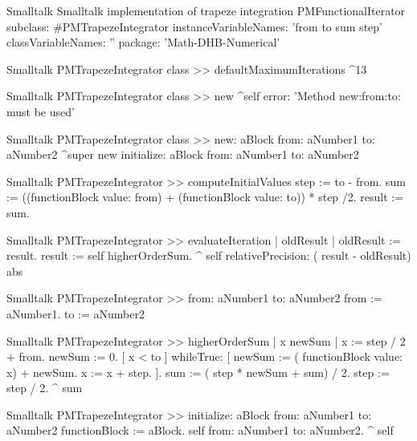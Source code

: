 \begin{listing}[label=lst:trapeze]{Smalltalk}
{Smalltalk implementation of trapeze integration}
PMFunctionalIterator subclass: #PMTrapezeIntegrator
   instanceVariableNames: 'from to sum step'
   classVariableNames: ''
   package: 'Math-DHB-Numerical'
\end{listing}

\begin{displaycode}{Smalltalk}
PMTrapezeIntegrator class >> defaultMaximumIterations
    ^13
\end{displaycode}

\begin{displaycode}{Smalltalk}
PMTrapezeIntegrator class >> new
    ^self error: 'Method new:from:to: must be used'
\end{displaycode}

\begin{displaycode}{Smalltalk}
PMTrapezeIntegrator class >> new: aBlock from: aNumber1 to: aNumber2
    ^super new initialize: aBlock from: aNumber1 to: aNumber2
\end{displaycode}

\begin{displaycode}{Smalltalk}
PMTrapezeIntegrator >> computeInitialValues
    step := to - from.
    sum := ((functionBlock value: from) + (functionBlock value: to)) * step /2.
    result := sum.
\end{displaycode}

\begin{displaycode}{Smalltalk}
PMTrapezeIntegrator >> evaluateIteration
    | oldResult |
    oldResult := result.
    result := self higherOrderSum.
    ^ self relativePrecision: ( result - oldResult) abs
\end{displaycode}

\begin{displaycode}{Smalltalk}
PMTrapezeIntegrator >> from: aNumber1 to: aNumber2
    from := aNumber1.
    to := aNumber2
\end{displaycode}

\begin{displaycode}{Smalltalk}
PMTrapezeIntegrator >> higherOrderSum
    | x newSum |
    x := step / 2 + from.
    newSum := 0.
    [ x < to ]
        whileTrue: [ newSum := ( functionBlock value: x) + newSum.
                     x := x + step.
                   ].
    sum := ( step * newSum + sum) / 2.
    step := step / 2.
    ^ sum
\end{displaycode}

\begin{displaycode}{Smalltalk}
PMTrapezeIntegrator >> initialize: aBlock from: aNumber1 to: aNumber2
    functionBlock := aBlock.
    self from: aNumber1 to: aNumber2.
    ^ self
\end{displaycode}

